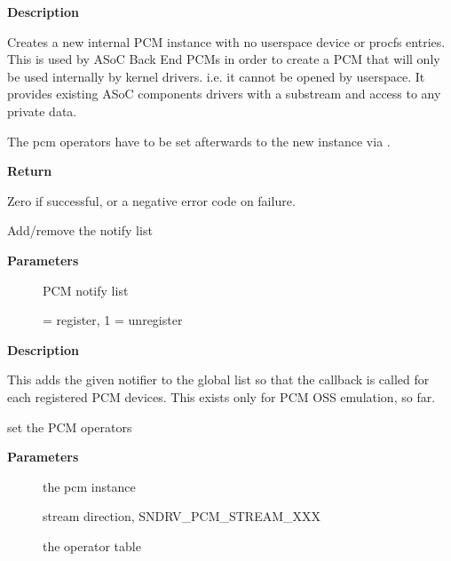 \documentclass[a4paper,8pt,english]{sphinxmanual}
\begin{document}
\textbf{Description}

Creates a new internal PCM instance with no userspace device or procfs
entries. This is used by ASoC Back End PCMs in order to create a PCM that
will only be used internally by kernel drivers. i.e. it cannot be opened
by userspace. It provides existing ASoC components drivers with a substream
and access to any private data.

The pcm operators have to be set afterwards to the new instance
via .

\textbf{Return}

Zero if successful, or a negative error code on failure.

\begin{fulllineitems}
\label{sound/kernel-api/alsa-driver-api:c.snd_pcm_notify}
Add/remove the notify list

\end{fulllineitems}


\textbf{Parameters}
\begin{description}
\item[{}] \leavevmode
PCM notify list

\item[{}]  = register, 1 = unregister

\end{description}

\textbf{Description}

This adds the given notifier to the global list so that the callback is
called for each registered PCM devices.  This exists only for PCM OSS
emulation, so far.

\begin{fulllineitems}
\label{sound/kernel-api/alsa-driver-api:c.snd_pcm_set_ops}
set the PCM operators

\end{fulllineitems}


\textbf{Parameters}
\begin{description}
\item[{}] \leavevmode
the pcm instance

\item[{}] \leavevmode
stream direction, SNDRV\_PCM\_STREAM\_XXX

\item[{}] \leavevmode
the operator table

\end{description}
\end{document}
